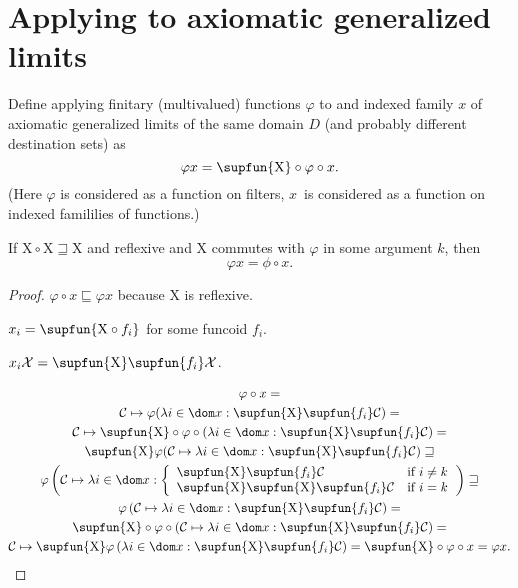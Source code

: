 \section{Applying to axiomatic generalized limits}

\begin{defn}
  Define applying finitary (multivalued) functions $\varphi$ to and indexed
  family $x$ of axiomatic generalized limits of the same domain $D$ (and probably different destination sets) as
  \[ \varphi x = \supfun{\mathrm{X}} \circ \varphi \circ x. \]
(Here $\varphi$ is considered as a function on filters, $x$~is considered as a function on indexed famililies of functions.)
\end{defn}

\begin{prop}
  If $\mathrm{X} \circ \mathrm{X} \sqsupseteq \mathrm{X}$ and reflexive and
  $\mathrm{X}$ commutes with $\varphi$ in some argument $k$, then
  \[ \varphi x = \phi \circ x . \]
\end{prop}

\begin{proof}
  $\varphi \circ x \sqsubseteq \varphi x$ because $\mathrm{X}$ is reflexive.
  
  $x_i = \supfun{\mathrm{X} \circ f_i}$ for some funcoid $f_i$.
  
  $x_i \mathcal{X} = \supfun{\mathrm{X}} \supfun{f_i } \mathcal{X}$.
  
  \begin{multline*}\varphi \circ x =\\ \mathcal{C} \mapsto \varphi (\lambda i \in
  \dom x : \supfun{\mathrm{X}} \supfun{f_i} \mathcal{C}) =\\ \mathcal{C} \mapsto \supfun{\mathrm{X}}\circ \varphi \circ (\lambda i \in
  \dom x : \supfun{\mathrm{X}} \supfun{f_i} \mathcal{C}) =\\
  \supfun{\mathrm{X}}\varphi(\mathcal{C} \mapsto \lambda i \in
  \dom x : \supfun{\mathrm{X}} \supfun{f_i} \mathcal{C}) \sqsupseteq\\
  \varphi \left( \mathcal{C} \mapsto \lambda i \in \dom x : \left\{\begin{array}{ll}
    \supfun{\mathrm{X}} \supfun{f_i} \mathcal{C} & \text{if } i \neq k\\
    \supfun{\mathrm{X}} \supfun{\mathrm{X}} \supfun{f_i} \mathcal{C} & \text{if } i =
    k
  \end{array}\right. \right) \sqsupseteq\\ \varphi \left( \mathcal{C} \mapsto \lambda i \in
  \dom x : \supfun{\mathrm{X}} \supfun{f_i} \mathcal{C} \right) =\\ \supfun{\mathrm{X}} \circ \varphi \circ \left( \mathcal{C} \mapsto \lambda i \in
  \dom x : \supfun{\mathrm{X}} \supfun{f_i} \mathcal{C} \right) = \\ \mathcal{C} \mapsto \supfun{\mathrm{X}} \varphi \left( \lambda i \in
  \dom x : \supfun{\mathrm{X}} \supfun{f_i} \mathcal{C} \right) =
  \supfun{\mathrm{X}}\circ\varphi\circ x = \varphi x.\end{multline*}
\end{proof}

